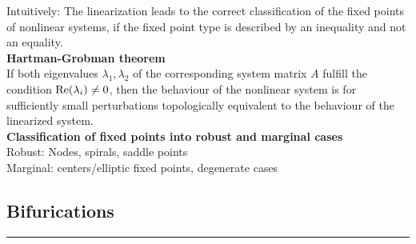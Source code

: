 Intuitively: The linearization leads to the correct classification of the fixed points of nonlinear systems, if the fixed point type is described by an inequality and not an equality.\\

\textbf{Hartman-Grobman theorem}\\
If both eigenvalues $\lambda_1, \lambda_2$ of the corresponding system matrix $A$ fulfill the condition $\textup{Re}(\lambda_i) \neq 0$, then the behaviour of the nonlinear system is for sufficiently small perturbations topologically equivalent to the behaviour of the linearized system.\\

\textbf{Classification of fixed points into robust and marginal cases}\\
Robust: Nodes, spirals, saddle points\\
Marginal: centers/elliptic fixed points, degenerate cases

\subsection{Bifurications}
\noindent\rule[\linienAbstand]{\linewidth}{\linienDicke}
